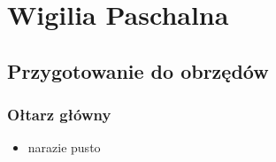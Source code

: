 \chapter{Wigilia Paschalna}

	\section{Przygotowanie do obrzędów}

		\subsection{Ołtarz główny}
		
			\begin{itemize}
				\item narazie pusto
			\end{itemize}